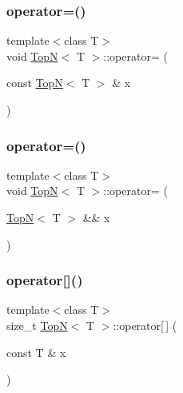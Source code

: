 \mbox{\label{class_top_n_ac6afd8e83833aedc8690c3a0622d5535}} 
\subsubsection{\texorpdfstring{operator=()}{operator=()}\hspace{0.1cm}{\footnotesize\ttfamily [1/2]}}
{\footnotesize\ttfamily template$<$class T$>$ \\
void \hyperlink{class_top_n}{TopN}$<$ T $>$\+::operator= (\begin{DoxyParamCaption}\item[{const \hyperlink{class_top_n}{TopN}$<$ T $>$ \&}]{x }\end{DoxyParamCaption})\hspace{0.3cm}{\ttfamily [inline]}}

\mbox{\label{class_top_n_ae8dfc906735d0aa9774d9e6c17cc9d1c}} 
\subsubsection{\texorpdfstring{operator=()}{operator=()}\hspace{0.1cm}{\footnotesize\ttfamily [2/2]}}
{\footnotesize\ttfamily template$<$class T$>$ \\
void \hyperlink{class_top_n}{TopN}$<$ T $>$\+::operator= (\begin{DoxyParamCaption}\item[{\hyperlink{class_top_n}{TopN}$<$ T $>$ \&\&}]{x }\end{DoxyParamCaption})\hspace{0.3cm}{\ttfamily [inline]}}

\mbox{\label{class_top_n_a7eafee63f9094086c3193ff005cd9f0f}} 
\subsubsection{\texorpdfstring{operator[]()}{operator[]()}}
{\footnotesize\ttfamily template$<$class T$>$ \\
size\+\_\+t \hyperlink{class_top_n}{TopN}$<$ T $>$\+::operator\mbox{[}$\,$\mbox{]} (\begin{DoxyParamCaption}\item[{const T \&}]{x }\end{DoxyParamCaption})\hspace{0.3cm}{\ttfamily [inline]}}


